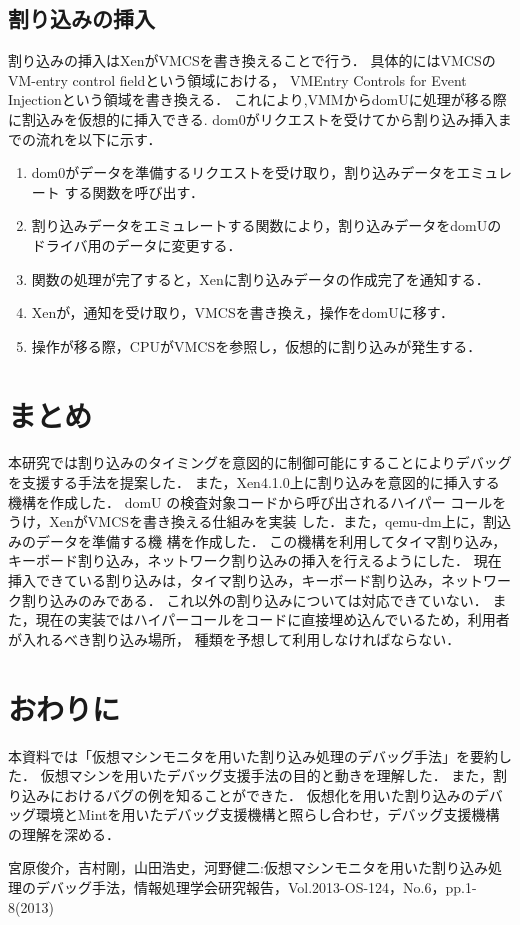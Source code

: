 \documentclass[12pt]{jsarticle}
\begin{document}
\subsection{割り込みの挿入}
割り込みの挿入はXenがVMCSを書き換えることで行う．
具体的にはVMCSのVM-entry control fieldという領域における，
VMEntry Controls for Event Injectionという領域を書き換える．
これにより,VMMからdomUに処理が移る際に割込みを仮想的に挿入できる.
dom0がリクエストを受けてから割り込み挿入までの流れを以下に示す．
\begin{enumerate}
\item dom0がデータを準備するリクエストを受け取り，割り込みデータをエミュレート
する関数を呼び出す．
\item 割り込みデータをエミュレートする関数により，割り込みデータをdomUのドライバ用のデータに変更する．
\item 関数の処理が完了すると，Xenに割り込みデータの作成完了を通知する．
\item Xenが，通知を受け取り，VMCSを書き換え，操作をdomUに移す．
\item 操作が移る際，CPUがVMCSを参照し，仮想的に割り込みが発生する．
\end{enumerate}
\section{まとめ}
本研究では割り込みのタイミングを意図的に制御可能にすることによりデバッグを支援する手法を提案した．
また，Xen4.1.0上に割り込みを意図的に挿入する機構を作成した．
domU の検査対象コードから呼び出されるハイパー
コールをうけ，XenがVMCSを書き換える仕組みを実装
した．また，qemu-dm上に，割込みのデータを準備する機
構を作成した．
この機構を利用してタイマ割り込み，キーボード割り込み，ネットワーク割り込みの挿入を行えるようにした．
現在挿入できている割り込みは，タイマ割り込み，キーボード割り込み，ネットワーク割り込みのみである．
これ以外の割り込みについては対応できていない．
また，現在の実装ではハイパーコールをコードに直接埋め込んでいるため，利用者が入れるべき割り込み場所，
種類を予想して利用しなければならない．

\section{おわりに}
本資料では「仮想マシンモニタを用いた割り込み処理のデバッグ手法」\cite{doc1}を要約した．
仮想マシンを用いたデバッグ支援手法の目的と動きを理解した．
また，割り込みにおけるバグの例を知ることができた．
仮想化を用いた割り込みのデバッグ環境とMintを用いたデバッグ支援機構と照らし合わせ，デバッグ支援機構の理解を深める．

\begin{thebibliography}{9}
 宮原俊介，吉村剛，山田浩史，河野健二:仮想マシンモニタを用いた割り込み処理のデバッグ手法，情報処理学会研究報告，Vol.2013-OS-124，No.6，pp.1-8(2013)
\end{thebibliography}
\end{document}
